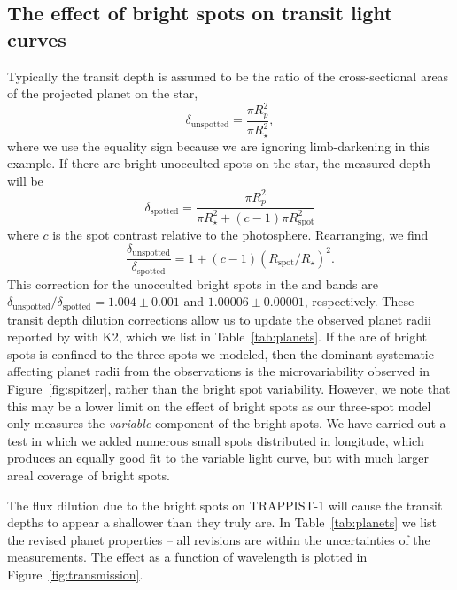 \begin{subappendices}
\section{The effect of bright spots on transit light curves} \label{sec:transits}

Typically the transit depth is assumed to be the ratio of the cross-sectional areas of the projected planet on the star, 
\begin{equation}
\delta_\mathrm{unspotted} = \frac{\pi R_p^2}{\pi R_\star^2},
\end{equation}
where we use the equality sign because we are ignoring limb-darkening in this example. If there are bright unocculted spots on the star, the measured depth will be 
\begin{equation}
\delta_\mathrm{spotted} = \frac{\pi R_p^2}{\pi R_\star^2 + (c-1) \pi R_\mathrm{spot}^2}
\end{equation}
where $c$ is the spot contrast relative to the photosphere. Rearranging, we find
\begin{equation}
\frac{\delta_\mathrm{unspotted}}{\delta_\mathrm{spotted}} = 1 + (c-1) (R_\mathrm{spot}/R_\star)^2.
\end{equation}
This correction for the unocculted bright spots in the \kepler and \spitzer bands are $\delta_\mathrm{unspotted}/\delta_\mathrm{spotted} = 1.004 \pm 0.001$ and $1.00006 \pm 0.00001$, respectively. These transit depth dilution corrections allow us to update the observed planet radii reported by \citet{Gillon2017} with K2, which we list in Table~\ref{tab:planets}.  If the are of bright spots is confined to the three spots we modeled, then the dominant systematic affecting planet radii from the \spitzer observations is the microvariability observed in Figure~\ref{fig:spitzer}, rather than the bright spot variability.   However, we note that this may be a lower limit on the effect of bright spots as our three-spot model only measures the {\it variable} component of the bright spots.  We have carried out a test in which we added numerous small spots distributed in longitude, which produces an equally good fit to the variable light curve, but with much larger areal coverage of bright spots.

The flux dilution due to the bright spots on TRAPPIST-1 will cause the transit depths to appear a shallower than they truly are. In Table~\ref{tab:planets} we list the revised planet properties -- all revisions are within the uncertainties of the measurements. The effect as a function of wavelength is plotted in Figure~\ref{fig:transmission}.


\end{subappendices}

